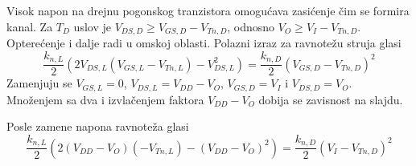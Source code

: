Visok napon na drejnu pogonskog tranzistora omogućava zasićenje čim se formira kanal. Za $T_D$ uslov je $V_{DS,D}\geq V_{GS,D}-V_{Tn,D}$, odnosno $V_O\geq V_I-V_{Tn,D}$. Opterećenje i dalje radi u omskoj oblasti. Polazni izraz za ravnotežu struja glasi
\[\frac{k_{n,L}}2\left(2V_{DS,L}(V_{GS,L}-V_{Tn,L})-V_{DS,L}^2\right)=\frac{k_{n,D}}2(V_{GS,D}-V_{Tn,D})^2\]
Zamenjuju se $V_{GS,L}=0$, $V_{DS,L}=V_{DD}-V_O$, $V_{GS,D}=V_I$ i $V_{DS,D}=V_O$. Množenjem sa dva i izvlačenjem faktora $V_{DD}-V_O$ dobija se zavisnost na slajdu.

Posle zamene napona ravnoteža glasi
\[\frac{k_{n,L}}2\left(2(V_{DD}-V_O)(-V_{Tn,L})-(V_{DD}-V_O)^2\right)=\frac{k_{n,D}}2(V_I-V_{Tn,D})^2\]
